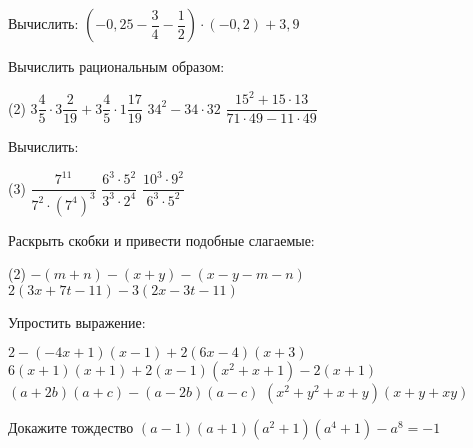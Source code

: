 \begin{class}[number=4]
	\begin{listofex}
	\item Вычислить: \( \left( -0,25-\dfrac{3}{4}-\dfrac{1}{2} \right)\cdot(-0,2)+3,9 \)
	\item Вычислить рациональным образом:
	\begin{tasks}(2)
		\task \( 3\dfrac{4}{5}\cdot3\dfrac{2}{19}+3\dfrac{4}{5}\cdot1\dfrac{17}{19} \)
		\task \( 34^2-34\cdot32 \)
		\task \( \dfrac{15^2+15\cdot13}{71\cdot49-11\cdot49} \)
	\end{tasks}
	\item Вычислить:
	\begin{tasks}(3)
		\task \( \dfrac{7^{11}}{7^2\cdot(7^4)^3} \)
		\task \( \dfrac{6^3\cdot5^2}{3^3\cdot2^4} \)
		\task \( \dfrac{10^3\cdot9^2}{6^3\cdot5^2} \)
	\end{tasks}
	\item Раскрыть скобки и привести подобные слагаемые:
	\begin{tasks}(2)
		\task \( -(m+n)-(x+y)-(x-y-m-n) \)
		\task \( 2(3x+7t-11)-3(2x-3t-11) \)
	\end{tasks}
	\item Упростить выражение:
	\begin{tasks} 
		\task \( 2-(-4x+1)(x-1)+2(6x-4)(x+3) \)
		\task \( 6(x+1)(x+1)+2(x-1)(x^2+x+1)-2(x+1) \)
		\task \( (a+2b)(a+c)-(a-2b)(a-c) \)
		\task \( (x^2+y^2+x+y)(x+y+xy) \)
	\end{tasks}
	\item Докажите тождество \( (a-1)(a+1)(a^2+1)(a^4+1)-a^8=-1 \)
	\end{listofex}
\end{class}

